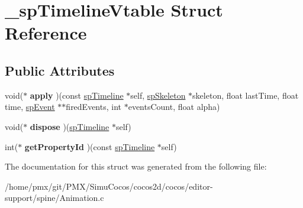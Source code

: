 \hypertarget{struct__spTimelineVtable}{}\section{\+\_\+sp\+Timeline\+Vtable Struct Reference}
\label{struct__spTimelineVtable}
\subsection*{Public Attributes}
\begin{DoxyCompactItemize}
\item 
\mbox{\label{struct__spTimelineVtable_abc4b78cb496ce770b3b87ecc9c5325b3}} 
void($\ast$ {\bfseries apply} )(const \hyperlink{structspTimeline}{sp\+Timeline} $\ast$self, \hyperlink{structspSkeleton}{sp\+Skeleton} $\ast$skeleton, float last\+Time, float time, \hyperlink{structspEvent}{sp\+Event} $\ast$$\ast$fired\+Events, int $\ast$events\+Count, float alpha)
\item 
\mbox{\label{struct__spTimelineVtable_a559a4d1baf8da45b0f782889283041af}} 
void($\ast$ {\bfseries dispose} )(\hyperlink{structspTimeline}{sp\+Timeline} $\ast$self)
\item 
\mbox{\label{struct__spTimelineVtable_adc310756d0c385f372a681d693aa4766}} 
int($\ast$ {\bfseries get\+Property\+Id} )(const \hyperlink{structspTimeline}{sp\+Timeline} $\ast$self)
\end{DoxyCompactItemize}


The documentation for this struct was generated from the following file\+:\begin{DoxyCompactItemize}
\item 
/home/pmx/git/\+P\+M\+X/\+Simu\+Cocos/cocos2d/cocos/editor-\/support/spine/Animation.\+c\end{DoxyCompactItemize}
